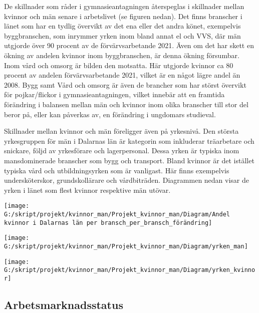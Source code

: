 \documentclass[
]{article}
\begin{document}
De skillnader som råder i gymnasieantagningen återspeglas i skillnader
mellan kvinnor och män senare i arbetslivet (se figuren nedan). Det
finns branscher i länet som har en tydlig övervikt av det ena eller det
andra könet, exempelvis byggbranschen, som inrymmer yrken inom bland
annat el och VVS, där män utgjorde över 90 procent av de
förvärvsarbetande 2021. Även om det har skett en ökning av andelen
kvinnor inom byggbranschen, är denna ökning försumbar. Inom vård och
omsorg är bilden den motsatta. Här utgjorde kvinnor ca 80 procent av
andelen förvärvsarbetande 2021, vilket är en något lägre andel än 2008.
Bygg samt Vård och omsorg är även de brancher som har störst övervikt
för pojkar/flickor i gymnasieantagningen, vilket innebär att en framtida
förändring i balansen mellan män och kvinnor inom olika branscher till
stor del beror på, eller kan påverkas av, en förändring i ungdomars
studieval.

Skillnader mellan kvinnor och män föreligger även på yrkesnivå. Den
största yrkesgruppen för män i Dalarnas län är kategorin som inkluderar
träarbetare och snickare, följd av yrkesförare och lagerpersonal. Dessa
yrken är typiska inom mansdominerade branscher som bygg och transport.
Bland kvinnor är det istället typiska vård och utbildningsyrken som är
vanligast. Här finns exempelvis undersköterskor, grundskollärare och
vårdbiträden. Diagrammen nedan visar de yrken i länet som flest kvinnor
respektive män utövar.

\begin{center}\texttt{[image: G:/skript/projekt/kvinnor\_man/Projekt\_kvinnor\_man/Diagram/Andel kvinnor i Dalarnas län per bransch\_per\_bransch\_förändring]} \end{center}

\begin{center}\texttt{[image: G:/skript/projekt/kvinnor\_man/Projekt\_kvinnor\_man/Diagram/yrken\_man]} \end{center}

\begin{center}\texttt{[image: G:/skript/projekt/kvinnor\_man/Projekt\_kvinnor\_man/Diagram/yrken\_kvinnor]} \end{center}

\hypertarget{arbetsmarknadsstatus}{%
\subsection{Arbetsmarknadsstatus}\label{arbetsmarknadsstatus}}
\end{document}
